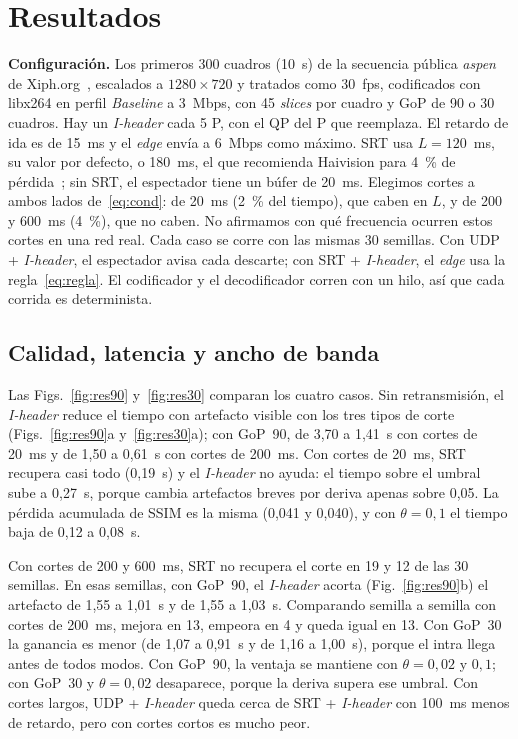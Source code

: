 \documentclass[10pt,twocolumn,letterpaper]{article}
\begin{document}
\section{Resultados}
\label{sec:resultados}


\textbf{Configuración.} Los primeros 300 cuadros (10~s) de la secuencia pública \emph{aspen} de Xiph.org~\cite{xiph}, escalados a $1280\times720$ y tratados como 30~fps, codificados con libx264 en perfil \emph{Baseline} a 3~Mbps, con 45 \emph{slices} por cuadro y GoP de 90 o 30 cuadros. Hay un \emph{I-header} cada 5 P, con el QP del P que reemplaza. El retardo de ida es de 15~ms y el \emph{edge} envía a 6~Mbps como máximo. SRT usa $L=120$~ms, su valor por defecto, o 180~ms, el que recomienda Haivision para 4~\% de pérdida~\cite{haivision}; sin SRT, el espectador tiene un búfer de 20~ms. Elegimos cortes a ambos lados de~\eqref{eq:cond}: de 20~ms (2~\% del tiempo), que caben en $L$, y de 200 y 600~ms (4~\%), que no caben. No afirmamos con qué frecuencia ocurren estos cortes en una red real. Cada caso se corre con las mismas 30 semillas. Con UDP + \emph{I-header}, el espectador avisa cada descarte; con SRT + \emph{I-header}, el \emph{edge} usa la regla~\eqref{eq:regla}. El codificador y el decodificador corren con un hilo, así que cada corrida es determinista.

\subsection{Calidad, latencia y ancho de banda}
Las Figs.~\ref{fig:res90} y~\ref{fig:res30} comparan los cuatro casos. Sin retransmisión, el \emph{I-header} reduce el tiempo con artefacto visible con los tres tipos de corte (Figs.~\ref{fig:res90}a y~\ref{fig:res30}a); con GoP~90, de 3,70 a 1,41~s con cortes de 20~ms y de 1,50 a 0,61~s con cortes de 200~ms. Con cortes de 20~ms, SRT recupera casi todo (0,19~s) y el \emph{I-header} no ayuda: el tiempo sobre el umbral sube a 0,27~s, porque cambia artefactos breves por deriva apenas sobre 0,05. La pérdida acumulada de SSIM es la misma (0,041 y 0,040), y con $\theta=0{,}1$ el tiempo baja de 0,12 a 0,08~s.

Con cortes de 200 y 600~ms, SRT no recupera el corte en 19 y 12 de las 30 semillas. En esas semillas, con GoP~90, el \emph{I-header} acorta (Fig.~\ref{fig:res90}b) el artefacto de 1,55 a 1,01~s y de 1,55 a 1,03~s. Comparando semilla a semilla con cortes de 200~ms, mejora en 13, empeora en 4 y queda igual en 13. Con GoP~30 la ganancia es menor (de 1,07 a 0,91~s y de 1,16 a 1,00~s), porque el intra llega antes de todos modos. Con GoP~90, la ventaja se mantiene con $\theta=0{,}02$ y $0{,}1$; con GoP~30 y $\theta=0{,}02$ desaparece, porque la deriva supera ese umbral. Con cortes largos, UDP + \emph{I-header} queda cerca de SRT + \emph{I-header} con 100~ms menos de retardo, pero con cortes cortos es mucho peor.
\end{document}
